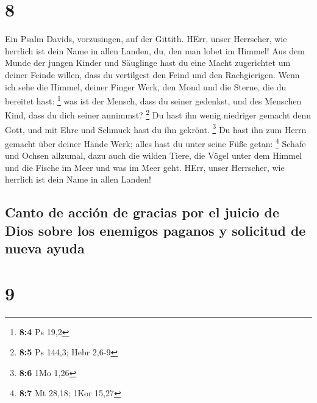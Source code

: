 \hypertarget{section-7}{%
\section{8}\label{section-7}}

 Ein Psalm Davids, vorzusingen, auf der Gittith.
 HErr, unser Herrscher, wie herrlich ist dein Name in
allen Landen, du, den man lobet im Himmel!  Aus dem Munde
der jungen Kinder und Säuglinge hast du eine Macht zugerichtet um deiner
Feinde willen, dass du vertilgest den Feind und den Rachgierigen.
 Wenn ich sehe die Himmel, deiner Finger Werk, den Mond
und die Sterne, die du bereitet hast: \footnote{\textbf{8:4} Ps 19,2}
 was ist der Mensch, dass du seiner gedenkst, und des
Menschen Kind, dass du dich seiner annimmst? \footnote{\textbf{8:5} Ps
  144,3; Hebr 2,6-9}  Du hast ihn wenig niedriger gemacht
denn Gott, und mit Ehre und Schmuck hast du ihn gekrönt. \footnote{\textbf{8:6}
  1Mo 1,26}  Du hast ihn zum Herrn gemacht über deiner
Hände Werk; alles hast du unter seine Füße getan: \footnote{\textbf{8:7}
  Mt 28,18; 1Kor 15,27}  Schafe und Ochsen allzumal, dazu
auch die wilden Tiere,  die Vögel unter dem Himmel und die
Fische im Meer und was im Meer geht.  HErr, unser
Herrscher, wie herrlich ist dein Name in allen Landen!

\hypertarget{canto-de-acciuxf3n-de-gracias-por-el-juicio-de-dios-sobre-los-enemigos-paganos-y-solicitud-de-nueva-ayuda}{%
\subsection{Canto de acción de gracias por el juicio de Dios sobre los
enemigos paganos y solicitud de nueva
ayuda}\label{canto-de-acciuxf3n-de-gracias-por-el-juicio-de-dios-sobre-los-enemigos-paganos-y-solicitud-de-nueva-ayuda}}

\hypertarget{section-8}{%
\section{9}\label{section-8}}


